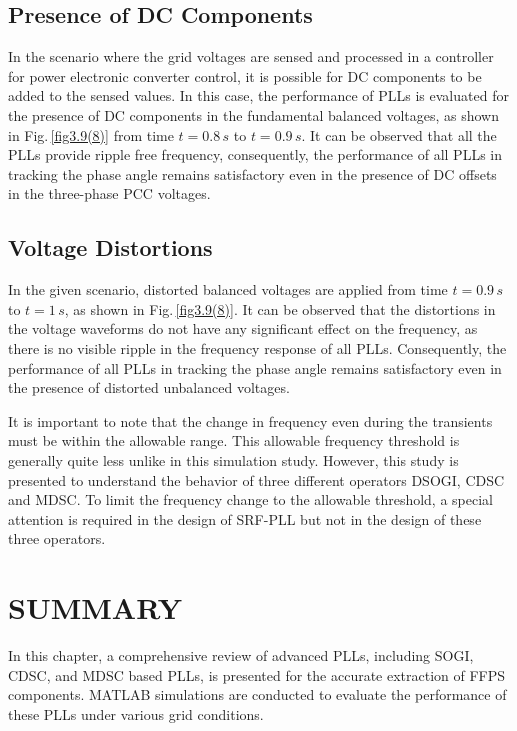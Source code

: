 \subsection{Presence of DC Components}
In the scenario where the grid voltages are sensed and processed in a controller for power electronic converter control, it is possible for DC components to be added to the sensed values. In this case, the performance of PLLs is evaluated for the presence of DC components in the fundamental balanced voltages, as shown in Fig.\,\ref{fig3.9(8)} from time $t=0.8\,\si{s}$ to $t=0.9\,\si{s}$. It can be observed that all the PLLs provide ripple free frequency, consequently, the performance of all PLLs in tracking the phase angle remains satisfactory even in the presence of DC offsets in the three-phase PCC voltages.
\subsection{Voltage Distortions}
In the given scenario, distorted balanced voltages are applied from time $t=0.9\,\si{s}$ to $t=1\,\si{s}$, as shown in Fig.\,\ref{fig3.9(8)}. It can be observed that the distortions in the voltage waveforms do not have any significant effect on the frequency, as there is no visible ripple in the frequency response of all PLLs. Consequently, the performance of all PLLs in tracking the phase angle remains satisfactory even in the presence of distorted unbalanced voltages.

It is important to note that the change in frequency even during the transients must be within the allowable range. This allowable frequency threshold is generally quite less unlike in this simulation study. However, this study is presented to understand the behavior of three different operators DSOGI, CDSC and MDSC. To limit the frequency change to the allowable threshold, a special attention is required in the design of SRF-PLL but not in the design of these three operators. 
    
\section{SUMMARY}
In this chapter, a comprehensive review of advanced PLLs, including SOGI, CDSC, and MDSC based PLLs, is presented for the accurate extraction of FFPS components. MATLAB simulations are conducted to evaluate the performance of these PLLs under various grid conditions.

